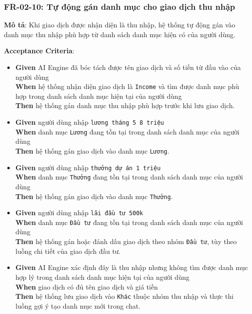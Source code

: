 \subsubsection{FR-02-10: Tự động gán danh mục cho giao dịch thu nhập}

\textbf{Mô tả}: Khi giao dịch được nhận diện là thu nhập, hệ thống tự động gán vào danh mục thu nhập phù hợp từ danh sách danh mục hiện có của người dùng.



\textbf{Acceptance Criteria}:

\begin{itemize}
\item \textbf{Given} AI Engine đã bóc tách được tên giao dịch và số tiền từ đầu vào của người dùng  \\ \hspace*{1.5em}  \textbf{When} hệ thống nhận diện giao dịch là \texttt{Income} và tìm được danh mục phù hợp trong danh sách danh mục hiện tại của người dùng  \\ \hspace*{1.5em}  \textbf{Then} hệ thống gán danh mục thu nhập phù hợp trước khi lưu giao dịch.
\item \textbf{Given} người dùng nhập \texttt{lương tháng 5 8 triệu}  \\ \hspace*{1.5em}  \textbf{When} danh mục \texttt{Lương} đang tồn tại trong danh sách danh mục của người dùng  \\ \hspace*{1.5em}  \textbf{Then} hệ thống gán giao dịch vào danh mục \texttt{Lương}.
\item \textbf{Given} người dùng nhập \texttt{thưởng dự án 1 triệu}  \\ \hspace*{1.5em}  \textbf{When} danh mục \texttt{Thưởng} đang tồn tại trong danh sách danh mục của người dùng  \\ \hspace*{1.5em}  \textbf{Then} hệ thống gán giao dịch vào danh mục \texttt{Thưởng}.
\item \textbf{Given} người dùng nhập \texttt{lãi đầu tư 500k}  \\ \hspace*{1.5em}  \textbf{When} danh mục \texttt{Đầu tư} đang tồn tại trong danh sách danh mục của người dùng  \\ \hspace*{1.5em}  \textbf{Then} hệ thống gán hoặc đánh dấu giao dịch theo nhóm \texttt{Đầu tư}, tùy theo luồng chi tiết của giao dịch đầu tư.
\item \textbf{Given} AI Engine xác định đây là thu nhập nhưng không tìm được danh mục hợp lý trong danh sách danh mục hiện tại của người dùng  \\ \hspace*{1.5em}  \textbf{When} giao dịch có đủ tên giao dịch và giá tiền  \\ \hspace*{1.5em}  \textbf{Then} hệ thống lưu giao dịch vào \texttt{Khác} thuộc nhóm thu nhập và thực thi luồng gợi ý tạo danh mục mới trong chat.
\end{itemize}
